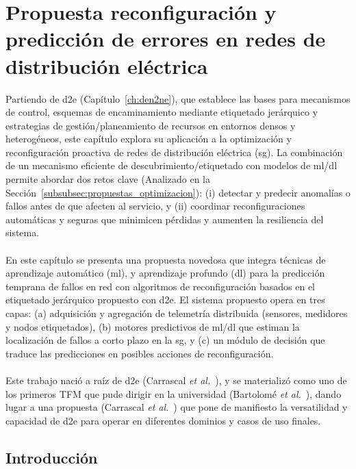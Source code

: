 \chapter{Propuesta reconfiguración y predicción de errores en redes de distribución eléctrica}
\label{ch:fault_sg}

Partiendo de \gls{d2e} (Capítulo~\ref{ch:den2ne}), que establece las bases para mecanismos de control, esquemas de encaminamiento mediante etiquetado jerárquico y estrategias de gestión/planeamiento de recursos en entornos densos y heterogéneos, este capítulo explora su aplicación a la optimización y reconfiguración proactiva de redes de distribución eléctrica (\gls{sg}). La combinación de un mecanismo eficiente de descubrimiento/etiquetado con modelos de \gls{ml}/\gls{dl} permite abordar dos retos clave (Analizado en la Sección~\ref{subsubsec:propuestas_optimizacion}): (i) detectar y predecir anomalías o fallos antes de que afecten al servicio, y (ii) coordinar reconfiguraciones automáticas y seguras que minimicen pérdidas y aumenten la resiliencia del sistema.\\
\\
En este capítulo se presenta una propuesta novedosa que integra técnicas de aprendizaje automático (\gls{ml}), y aprendizaje profundo (\gls{dl}) para la predicción temprana de fallos en red con algoritmos de reconfiguración basados en el etiquetado jerárquico propuesto con \gls{d2e}. El sistema propuesto opera en tres capas: (a) adquisición y agregación de telemetría distribuida (sensores, medidores y nodos etiquetados), (b) motores predictivos de \gls{ml}/\gls{dl} que estiman la localización de fallos a corto plazo en la \gls{sg}, y (c) un módulo de decisión que traduce las predicciones en posibles acciones de reconfiguración.\\
\\
Este trabajo nació a raíz de \gls{d2e} (Carrascal \textit{et al.}~\cite{carrascal2024topology}), y se materializó como uno de los primeros TFM que pude dirigir en la universidad (Bartolomé \textit{et al.}~\cite{bartolome2024_smartgrids}), dando lugar a una propuesta (Carrascal \textit{et al.}~\cite{carrascal2024fault}) que pone de manifiesto la versatilidad y capacidad de \gls{d2e} para operar en diferentes dominios y casos de uso finales.

\section{Introducción}


